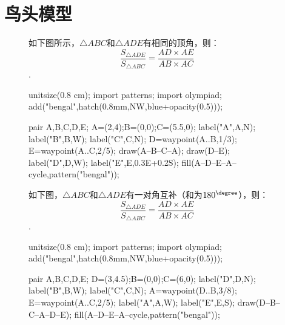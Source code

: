 \documentclass[12pt,space]{ctexart} %
\begin{document}
\section{鸟头模型}
\begin{figure}[ht]
	\begin{minipage}[b]{0.4\textwidth}
		如下图所示，$\triangle ABC$和$\triangle ADE$有相同的顶角，则：
		$$\frac{S_{\triangle ADE}}{S_{\triangle ABC}}=\frac{AD\times AE}{AB\times AC}$$.\\
		\begin{asy}
			unitsize(0.8 cm);
			import patterns;
			import olympiad;
			add("bengal",hatch(0.8mm,NW,blue+opacity(0.5)));

			pair A,B,C,D,E;
			A=(2,4);B=(0,0);C=(5.5,0);
			label("A",A,N);
			label("B",B,W);
			label("C",C,N);
			D=waypoint(A..B,1/3);
			E=waypoint(A..C,2/5);
			draw(A--B--C--A);
			draw(D--E);
			label("D",D,W);
			label("E",E,0.3E+0.2S);
			fill(A--D--E--A--cycle,pattern("bengal"));
		\end{asy}
	\end{minipage}
	\qquad
	\begin{minipage}[b]{0.45\textwidth}
		如下图，$\triangle ABC$和$\triangle ADE$有一对角互补（和为$180^{\degree}$），则：
		$$\frac{S_{\triangle ADE}}{S_{\triangle ABC}}=\frac{AD\times AE}{AB\times AC}$$.
		\begin{asy}
			unitsize(0.8 cm);
			import patterns;
			import olympiad;
			add("bengal",hatch(0.8mm,NW,blue+opacity(0.5)));

			pair A,B,C,D,E;
			D=(3,4.5);B=(0,0);C=(6,0);
			label("D",D,N);
			label("B",B,W);
			label("C",C,N);
			A=waypoint(D..B,3/8);
			E=waypoint(A..C,2/5);
			label("A",A,W);
			label("E",E,S);
			draw(D--B--C--A--D--E);
			fill(A--D--E--A--cycle,pattern("bengal"));
		\end{asy}
	\end{minipage}
\end{figure}
\vspace{1cm}
\end{document}
